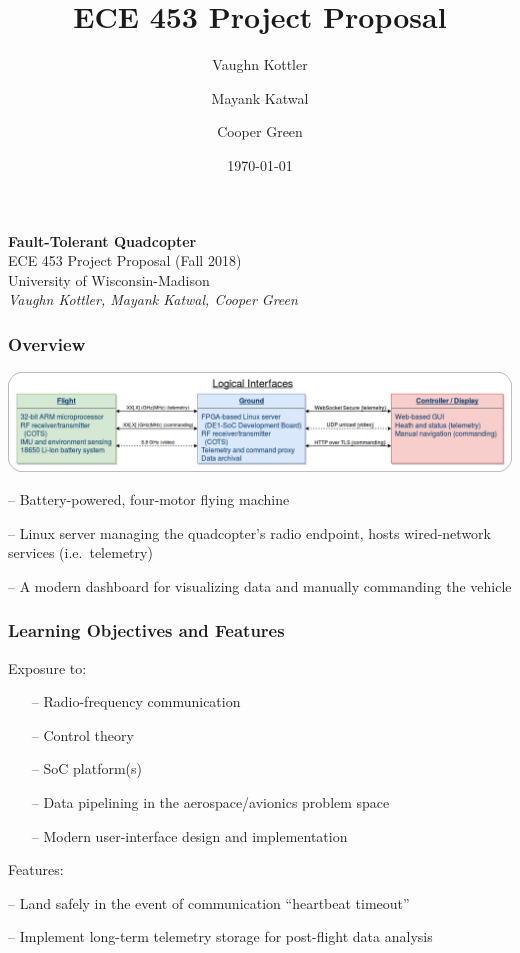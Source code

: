 \documentclass{beamer}
\title{ECE 453 Project Proposal}
\author{Vaughn Kottler}
\author{Mayank Katwal}
\author{Cooper Green}
\date{\today}
\begin{document}
\begin{frame}
\begin{center}
{\Large\textbf{Fault-Tolerant Quadcopter}}\\
\vspace{\baselineskip}
ECE 453 Project Proposal (Fall 2018)\\
University of Wisconsin-Madison\\
\vspace{\baselineskip}
{\large\textit{Vaughn Kottler, Mayank Katwal, Cooper Green}}
\end{center}
\end{frame}

\begin{frame}
\frametitle{Overview}
\begin{center}
\includegraphics[width=\linewidth]{../src/im/top_level}
\end{center}
\vspace{\baselineskip}
\begin{description}[align=right,labelwidth=80pt,itemsep=10pt]
\item [Quadcopter] -- Battery-powered, four-motor flying machine
\item [Ground Station] -- Linux server managing the quadcopter's
	radio endpoint, hosts wired-network services (i.e.\ telemetry)
\item [Web-based UI] -- A modern dashboard for visualizing data
	and manually commanding the vehicle
\end{description}
\end{frame}

\begin{frame}
\frametitle{Learning Objectives and Features}
Exposure to:
\begin{itemize}
	\item [--] Radio-frequency communication
	\item [--] Control theory
	\item [--] SoC platform(s)
	\item [--] Data pipelining in the aerospace/avionics problem space
	\item [--] Modern user-interface design and implementation
\end{itemize}
\vspace{\baselineskip}
Features:
\begin{description}[align=right,labelwidth=120pt]
	\item [Single-Fault Tolerant] -- Land safely in the event of communication
		``heartbeat timeout''
	\item [Telemetry Archival] -- Implement long-term telemetry storage for
		post-flight data analysis
\end{description}
\end{frame}
\end{document}
